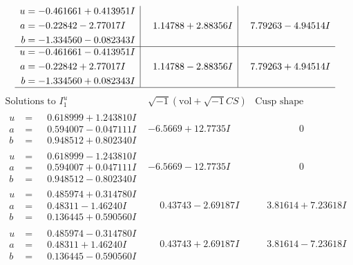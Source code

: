 \documentclass[1p]{elsarticle_modified}
\theoremstyle{definition}
\newcommand{\I}{\sqrt{-1}}
\begin{document}
$$\begin{array}{c|c|c}
\begin{aligned}
u &= -0.461661 + 0.413951 I \\
a &= -0.22842 - 2.77017 I \\
b &= -1.334560 - 0.082343 I\end{aligned}
 & \phantom{-}1.14788 + 2.88356 I & \phantom{-}7.79263 - 4.94514 I \\ \hline\begin{aligned}
u &= -0.461661 - 0.413951 I \\
a &= -0.22842 + 2.77017 I \\
b &= -1.334560 + 0.082343 I\end{aligned}
 & \phantom{-}1.14788 - 2.88356 I & \phantom{-}7.79263 + 4.94514 I\\
 \hline 
 \end{array}$$\newpage$$\begin{array}{c|c|c}  
\text{Solutions to }I^u_{1}& \I (\text{vol} + \sqrt{-1}CS) & \text{Cusp shape}\\
 \hline 
\begin{aligned}
u &= \phantom{-}0.618999 + 1.243810 I \\
a &= \phantom{-}0.594007 - 0.047111 I \\
b &= \phantom{-}0.948512 + 0.802340 I\end{aligned}
 & -6.5669 + 12.7735 I & \phantom{-0.000000 } 0 \\ \hline\begin{aligned}
u &= \phantom{-}0.618999 - 1.243810 I \\
a &= \phantom{-}0.594007 + 0.047111 I \\
b &= \phantom{-}0.948512 - 0.802340 I\end{aligned}
 & -6.5669 - 12.7735 I & \phantom{-0.000000 } 0 \\ \hline\begin{aligned}
u &= \phantom{-}0.485974 + 0.314780 I \\
a &= \phantom{-}0.48311 - 1.46240 I \\
b &= \phantom{-}0.136445 + 0.590560 I\end{aligned}
 & \phantom{-}0.43743 - 2.69187 I & \phantom{-}3.81614 + 7.23618 I \\ \hline\begin{aligned}
u &= \phantom{-}0.485974 - 0.314780 I \\
a &= \phantom{-}0.48311 + 1.46240 I \\
b &= \phantom{-}0.136445 - 0.590560 I\end{aligned}
 & \phantom{-}0.43743 + 2.69187 I & \phantom{-}3.81614 - 7.23618 I \\ \hline\begin{aligned}

\end{aligned}
\end{array}$$
\end{document}
